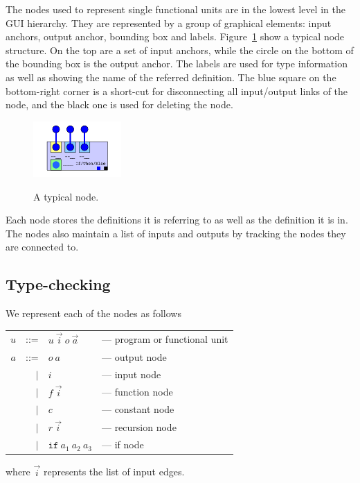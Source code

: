 \documentclass[12pt,UTF8,a4]{article}
\newcommand{\code}[1]{\texttt{#1}}
\begin{document}
The nodes used to represent single functional units are in the lowest level in the GUI hierarchy. They are represented by a group of graphical elements: input anchors, output anchor, bounding box and labels. Figure~\ref{fig:node} show a typical node structure. On the top are a set of input anchors, while the circle on the bottom of the bounding box is the output anchor. The labels are used for type information as well as showing the name of the referred definition. The blue square on the bottom-right corner is a short-cut for disconnecting all input/output links of the node, and the black one is used for deleting the node.
\begin{figure}[!ht]
\center
\includegraphics[width=0.3\textwidth]{./images/node} \\
\caption{A typical node.}\label{fig:node}
\end{figure}

Each node stores the definitions it is referring to as well as the definition it is in. The nodes also maintain a list of inputs and outputs by tracking the nodes they are connected to.

\subsection{Type-checking}
We represent each of the nodes as follows
\begin{center}
  \begin{tabular}{rrll}
    $u$ & ::= & $u\ \vec{i}\ o\ \vec{a}$ & --- program or functional unit
    \\
    $a$ & ::= & $o\ a$ & --- output node
    \\
    & $|$ & $i$ &  --- input node
    \\
    & $|$ & $f\ \vec{i}$ &  --- function node
    \\
    & $|$ & $c$ &  --- constant node
    \\
    & $|$ & $r\ \vec{i}$ &  --- recursion node
    \\
    & $|$ & $\code{if}\ a_1\ a_2\ a_3$ &  --- if node
    \\
  \end{tabular}
\end{center}
where $\vec{i}$ represents the list of input edges.
\end{document}
